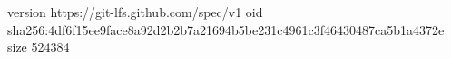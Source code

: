 version https://git-lfs.github.com/spec/v1
oid sha256:4df6f15ee9face8a92d2b2b7a21694b5be231c4961c3f46430487ca5b1a4372e
size 524384
